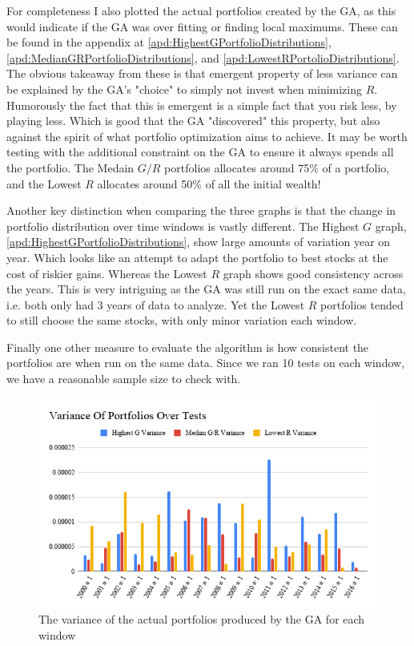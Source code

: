 \documentclass[11pt]{article}
\begin{document}
    For completeness I also plotted the actual portfolios created by the GA, as this
    would indicate if the GA was over fitting or finding local maximums. These can
    be found in the appendix at \ref{apd:HighestGPortfolioDistributions},
    \ref{apd:MedianGRPortfolioDistributions}, and
    \ref{apd:LowestRPortolioDistributions}. The obvious takeaway from these is that
    emergent property of less variance can be explained by the GA's "choice" to
    simply not invest when minimizing \(R\). Humorously the fact that this is emergent
    is a simple fact that you risk less, by playing less. Which is good that the GA
    "discovered" this property, but also against the spirit of what portfolio
    optimization aims to achieve. It may be worth testing with the additional
    constraint on the GA to ensure it always spends all the portfolio. The Medain
    \(G/R\) portfolios allocates around 75\% of a portfolio,
    and the Lowest \(R\) allocates around 50\% of all the initial wealth!

    Another key distinction when comparing the three graphs is that the change in
    portfolio distribution over time windows is vastly different. The Highest
    \(G\) graph, \ref{apd:HighestGPortfolioDistributions}, show large amounts
    of variation year on year. Which looks like an attempt to adapt the portfolio
    to best stocks at the cost of riskier gains. Whereas the Lowest \(R\) graph
    shows good consistency across the years. This is very intriguing as the
    GA was still run on the exact same data, i.e. both only had 3 years of data to
    analyze. Yet the Lowest \(R\) portfolios tended to still choose the same stocks,
    with only minor variation each window.

    Finally one other measure to evaluate the algorithm is how consistent the portfolios
    are when run on the same data. Since we ran 10 tests on each window, we have a reasonable
    sample size to check with.

    \begin{figure}[H] %
        \includegraphics[width=\textwidth]{VarianceOfPortfoliosOverTests}
        \caption{The variance of the actual portfolios produced by the GA for each window}
            \label{fig:VarianceOfPortfoliosOverTests}
    \end{figure}
\end{document}
